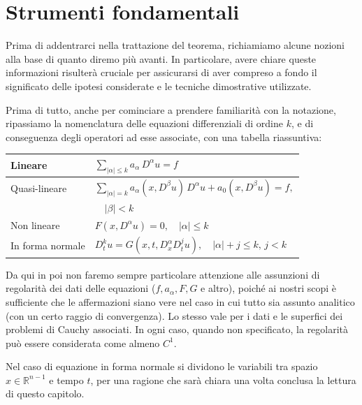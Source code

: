 \chapter{Strumenti fondamentali} \label{tools}
Prima di addentrarci nella trattazione del teorema, richiamiamo alcune nozioni alla base di quanto diremo più avanti. 
In particolare, avere chiare queste informazioni risulterà cruciale per assicurarsi di aver compreso a fondo il significato delle ipotesi considerate e le tecniche dimostrative utilizzate.

Prima di tutto, anche per cominciare a prendere familiarità con la notazione, ripassiamo la nomenclatura delle equazioni differenziali di ordine $k$, e di conseguenza degli operatori ad esse associate, con una tabella riassuntiva:
\vspace{5mm}
\begin{center}
\renewcommand{\arraystretch}{2}
\begin{tabular}{l l} 
\hline \hline
 Lineare & $\sum_{|\alpha |\leq k} a_\alpha \, D^\alpha u = f$ \\
 \hline
 \vspace{-2mm}
 Quasi-lineare & $\sum_{|\alpha |= k} a_\alpha (x,D^\beta u) \, D^\alpha u +  a_0(x,D^\beta u)= f,$\\
 & $\quad |\beta |<k $ \\
 \hline
 Non lineare & $F(x,D^\alpha u)=0, \quad |\alpha | \leq k$ \\
 \hline
 In forma normale & $D_{t}^k u = G(x,t, D^\alpha_x D^j_t u), \quad |\alpha |+j \leq k, \, j < k$ \\
 \hline \hline
\end{tabular}
\end{center}
\vspace{5mm}
\begin{remark}
Da qui in poi non faremo sempre particolare attenzione alle assunzioni di regolarità dei dati delle equazioni ($f,a_\alpha,F,G$ e altro), poiché ai nostri scopi è sufficiente che le affermazioni siano vere nel caso in cui tutto sia assunto analitico (con un certo raggio di convergenza). Lo stesso vale per i dati e le superfici dei problemi di Cauchy associati. In ogni caso, quando non specificato, la regolarità può essere considerata come almeno $C^1$.
\end{remark}
\begin{remark}
Nel caso di equazione in forma normale si dividono le variabili tra spazio $x\in \mathbb{R}^{n-1}$ e tempo $t$, per una ragione che sarà chiara una volta conclusa la lettura di questo capitolo.
\end{remark}
